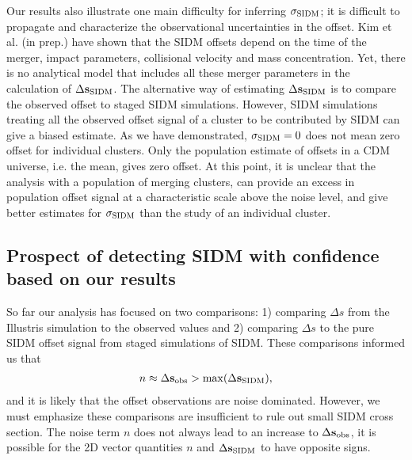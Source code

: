 Our results also illustrate one main difficulty for inferring $\sigma_{\rm SIDM}$; 
it is difficult to propagate and characterize the observational 
uncertainties in the offset. Kim et al. (in prep.) have shown 
that the SIDM offsets depend on the time of the 
merger, impact parameters, collisional velocity and mass concentration. 
Yet, there is no analytical model that includes all these merger
parameters in the calculation of $\Delta {\bf s}_{{\rm SIDM}}$.  
The alternative way of estimating $\Delta {\bf s}_{{\rm SIDM}}$ is to compare the observed
offset to staged SIDM simulations.
However, SIDM simulations treating all the observed offset signal of a cluster 
to be contributed by SIDM can give a biased estimate.  
As we have demonstrated, $\sigma_{\rm SIDM} = 0$ does not mean zero offset for
individual clusters.  
Only the population estimate of offsets in a CDM universe, i.e. the mean,
gives zero offset.  
At this point, it is unclear that the analysis with a population of
merging clusters, can provide an excess in population offset signal at a
characteristic scale above the noise level, and give 
better estimates for $\sigma_{\rm
SIDM}$ than the study of an individual cluster.  


\subsection{Prospect of detecting SIDM with confidence based on our results} 
\label{subsec:limitation_of_pvalue}
  
So far our analysis has focused on two comparisons: 1) comparing $\Delta s$ from
the Illustris simulation to the observed values and 2) comparing $\Delta s$ to  
the pure SIDM offset signal from staged simulations of SIDM. 
These comparisons informed us that 
\begin{align}
	n \approx \Delta {\bf s}_{\rm obs} > \max(\Delta {\bf s}_{{\rm SIDM}}),
\end{align}
and it is likely that the offset observations are noise dominated. 
However, we must emphasize these comparisons are
insufficient to rule out small SIDM cross section.  
The noise term $n$ does not always lead to an increase to $\Delta {\bf s}_{\rm
obs}$, it is possible for the 2D vector quantities $n$ and $\Delta {\bf s}_{{\rm SIDM}}$ to
have opposite signs. 

